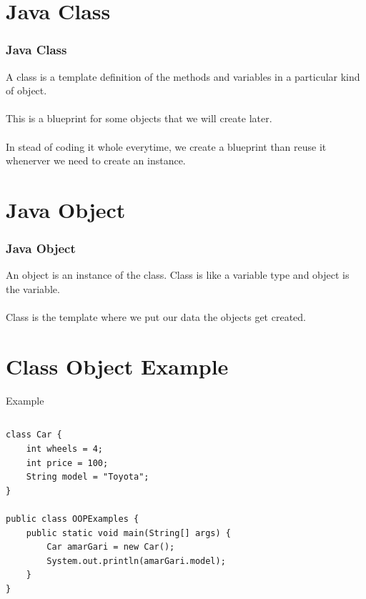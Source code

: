 \documentclass{beamer}
\begin{document}

\section{Java Class}

\begin{frame}
\frametitle{Java Class}
A class is a template definition of the methods and variables in a particular kind of object.\\~\\
This is a blueprint for some objects that we will create later.\\~\\
In stead of coding it whole everytime, we create a blueprint than reuse it whenerver we need to create an instance.
\end{frame}

\section{Java Object}

\begin{frame}
\frametitle{Java Object}
An object is an instance of the class. Class is like a variable type and object is the variable. \\~\\
Class is the template where we put our data the objects get created.
\end{frame}

\section{Class Object Example}


\begin{frame}[fragile]{Example}
\begin{columns}[T]
\begin{column}{\textwidth}
\begin{lstlisting}
class Car {
    int wheels = 4;
    int price = 100;
    String model = "Toyota";
}

public class OOPExamples {
    public static void main(String[] args) {
        Car amarGari = new Car();
        System.out.println(amarGari.model);
    }
}
\end{lstlisting}
\end{column}
\end{columns}
\end{frame}
\end{document}
